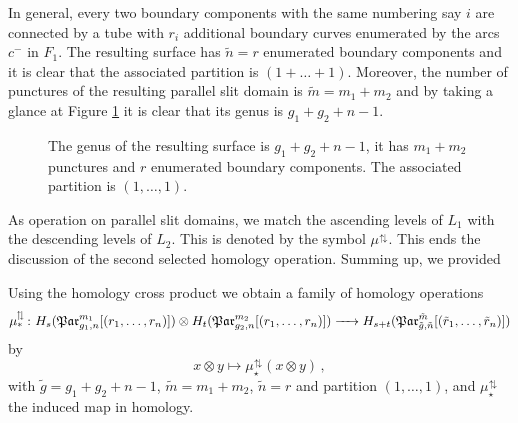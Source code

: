 In general, every two boundary components with the same numbering say $i$ are connected by a tube with $r_i$ additional boundary curves enumerated by the arcs $c^-$ in $F_1$.
The resulting surface has $\tilde n = r$ enumerated boundary components and it is clear that the associated partition is $(1 + \ldots + 1)$.
Moreover, the number of punctures of the resulting parallel slit domain is $\tilde m = m_1 + m_2$ and by taking a glance at Figure \ref{homology_operations:parallel_patching_slit_pics:parallel_mutliplication_global_glueing}
it is clear that its genus is $g_1+ g_2+ n-1$.
\begin{figure}[ht]
    \centering
    \def\svgwidth{.6\columnwidth}
    
    \caption{
        \label{homology_operations:parallel_patching_slit_pics:parallel_mutliplication_global_glueing}
        The genus of the resulting surface is $g_1+g_2 + n - 1$, it has $m_1 + m_2$ punctures and $r$ enumerated boundary components.
        The associated partition is $(1,\ldots,1)$.}
\end{figure}

As operation on parallel slit domains, we match the ascending levels of $L_1$ with the descending levels of $L_2$.
This is denoted by the symbol $\mu^{\updownarrows}$.
This ends the discussion of the second selected homology operation.
Summing up, we provided
\begin{defprop}
    \label{homology_operations:parallel_patching_slit_pics:operation_mu_updownarrows}
    Using the homology cross product we obtain a family of homology operations
    \[
        \mu^\updownarrows_\ast \colon H_s(\Par_{g_1,n}^{m_1}[(r_1, \ldots, r_n)])  \otimes H_t(\Par_{g_2,n}^{m_2}[(r_1, \ldots, r_n)]) \to H_{s+t}(\Par_{\tilde g,\tilde n}^{\tilde m}[(\tilde r_1, \ldots, \tilde r_n)])
    \]
    by
    \[
        x \otimes y \mapsto \mu^\updownarrows_\star( x \otimes y ) \,,
    \]
    with $\tilde g = g_1 + g_2 + n-1$, $\tilde m = m_1 + m_2$, $\tilde n = r$ and partition $(1, \ldots, 1)$, and $\mu^\updownarrows_\star$ the induced map in homology.
\end{defprop}

